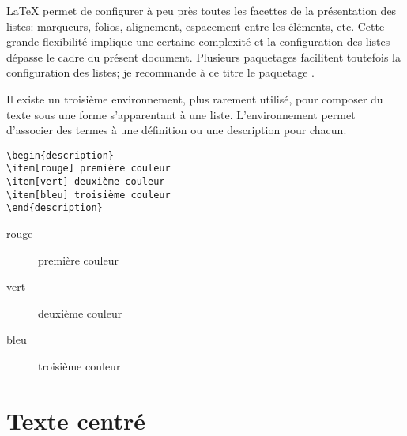 {\LaTeX} permet de configurer à peu près toutes les facettes de la
présentation des listes: marqueurs, folios, alignement, espacement entre
les éléments, etc. Cette grande flexibilité implique une certaine
complexité et la configuration des listes dépasse le cadre du présent
document. Plusieurs paquetages facilitent toutefois la configuration
des listes; je recommande à ce titre le paquetage 
\citep{enumitem}.


Il existe un troisième environnement, plus rarement utilisé, pour
composer du texte sous une forme s'apparentant à une liste.
L'environnement  permet d'associer des termes à une
définition ou une description pour chacun.
\begin{demo}
  \begin{texample}
\begin{lstlisting}
\begin{description}
\item[rouge] première couleur
\item[vert] deuxième couleur
\item[bleu] troisième couleur
\end{description}
\end{lstlisting}
    \producing
\begin{description}
\item[rouge] première couleur
\item[vert] deuxième couleur
\item[bleu] troisième couleur
\end{description}
  \end{texample}
\end{demo}


\section{Texte centré}
\label{sec:apparence:centering}

